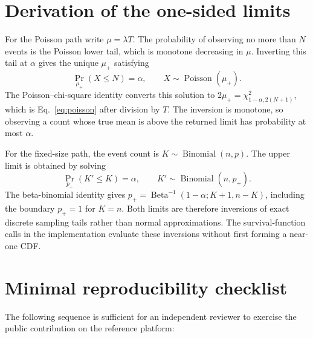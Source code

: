 \documentclass[submission, Phys]{SciPost}
\begin{document}
\appendix

\section{Derivation of the one-sided limits}
\label{app:limits}

For the Poisson path write $\mu=\lambda T$.  The probability of observing no
more than $N$ events is the Poisson lower tail, which is monotone decreasing in
$\mu$.  Inverting this tail at $\alpha$ gives the unique $\mu_+$ satisfying
\begin{equation}
 \Pr_{\mu_+}(X\le N)=\alpha,
 \qquad X\sim\operatorname{Poisson}(\mu_+).
 \label{eq:poisson-inversion}
\end{equation}
The Poisson--chi-square identity converts this solution to
$2\mu_+=\chi^2_{1-\alpha,2(N+1)}$, which is Eq.~\eqref{eq:poisson} after
division by $T$.  The inversion is monotone, so observing a count whose true
mean is above the returned limit has probability at most $\alpha$.

For the fixed-size path, the event count is $K\sim\operatorname{Binomial}(n,p)$.
The upper limit is obtained by solving
\begin{equation}
 \Pr_{p_+}(K'\le K)=\alpha,
 \qquad K'\sim\operatorname{Binomial}(n,p_+).
 \label{eq:binomial-inversion}
\end{equation}
The beta-binomial identity gives
$p_+=\operatorname{Beta}^{-1}(1-\alpha;K+1,n-K)$, including the boundary
$p_+=1$ for $K=n$.  Both limits are therefore inversions of exact discrete
sampling tails rather than normal approximations.  The survival-function calls
in the implementation evaluate these inversions without first forming a
near-one CDF.

\section{Minimal reproducibility checklist}
\label{app:checklist}

The following sequence is sufficient for an independent reviewer to exercise
the public contribution on the reference platform:
\end{document}
